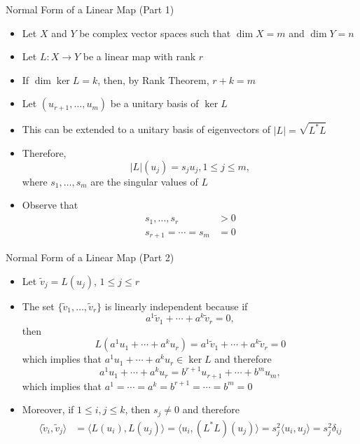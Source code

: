 \documentclass[usenames,dvipsnames,10pt]{beamer}
\begin{document}
\begin{frame}
  {Normal Form of a Linear Map (Part 1)}
  \begin{itemize}
  \item Let $X$ and $Y$ be complex vector spaces such that $\dim X = m$ and $\dim Y = n$
  \item Let $L: X \rightarrow Y$ be a linear map with rank $r$
  \item If $\dim \ker L = k$, then, by Rank Theorem, $r + k = m$
  \item Let $(u_{r+1}, \dots, u_m)$ be a unitary basis of $\ker L$
  \item This can be extended to a unitary basis of eigenvectors of $|L| = \sqrt{L^*L}$
  \item Therefore,
    \[
      |L|(u_j) = s_ju_j, 1 \le j \le m,
    \]
    where $s_1, \dots, s_m$ are the singular values of $L$
  \item Observe that
    \begin{align*}
      s_1, \dots, s_r &> 0\\
      s_{r+1} = \cdots = s_m &= 0
    \end{align*}
  \end{itemize}
\end{frame}

\begin{frame}
  {Normal Form of a Linear Map (Part 2)}

  \begin{itemize}
  \item Let $\tilde{v}_j = L(u_j)$, $1 \le j \le r$
  \item The set $\{\tilde{v}_1, \dots, \tilde{v}_r\}$ is linearly independent because if
    \[
      a^1\tilde{v}_1 + \cdots + a^k\tilde{v}_r = 0,
    \]
    then
    \[
      L(a^1u_1 + \cdots + a^ku_r) = a^1\tilde{v}_1 + \cdots + a^k\tilde{v}_r = 0
    \]
    which implies that $a^1u_1 + \cdots + a^ku_r \in \ker L$ and therefore
    \[
      a^1u_1 + \cdots + a^ku_r = b^{r+1}u_{r+1} + \cdots + b^mu_m,
    \]
    which implies that $a^1 = \cdots = a^k = b^{r+1} = \cdots = b^m = 0$
  \item Moreover, if $1 \le i, j \le k$, then $s_j \ne 0$ and therefore
    \begin{align*}
      \langle \tilde{v}_i,\tilde{v}_j\rangle &= \langle L(u_i),L(u_j)\rangle
                                               = \langle u_i, (L^*L)(u_j)\rangle
                                               = s_j^2\langle u_i,u_j\rangle
                                               = s_j^2\delta_{ij}
    \end{align*}
  \end{itemize}
\end{frame}
\end{document}
